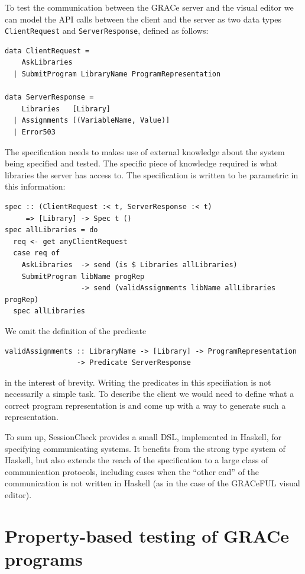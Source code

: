 \documentclass{article}
\begin{document}
To test the communication between the GRACe server and the visual editor we can model
the API calls between the client and the server as
two data types \texttt{ClientRequest} and
\texttt{ServerResponse}, defined as follows:
%
\begin{verbatim}
data ClientRequest =
    AskLibraries
  | SubmitProgram LibraryName ProgramRepresentation

data ServerResponse =
    Libraries   [Library]
  | Assignments [(VariableName, Value)]
  | Error503
\end{verbatim}

The specification needs to makes use of external knowledge about the system
being specified and tested.
%
The specific piece of knowledge required is what libraries the server has access
to.
%
The specification is written to be parametric in this information:

\begin{verbatim}
spec :: (ClientRequest :< t, ServerResponse :< t)
     => [Library] -> Spec t ()
spec allLibraries = do
  req <- get anyClientRequest
  case req of
    AskLibraries  -> send (is $ Libraries allLibraries)
    SubmitProgram libName progRep
                  -> send (validAssignments libName allLibraries progRep)
  spec allLibraries
\end{verbatim}

We omit the definition of the predicate
\begin{verbatim}
validAssignments :: LibraryName -> [Library] -> ProgramRepresentation
                 -> Predicate ServerResponse
\end{verbatim}
in the interest of brevity.
%
Writing the predicates in this specifiation is not necessarily a simple task.
%
To describe the client we would need to define what a correct program representation is
and come up with a way to generate such a representation.

To sum up, SessionCheck provides a small DSL, implemented in Haskell,
for specifying communicating systems.
%
It benefits from the strong type system of Haskell, but also extends
the reach of the specification to a large class of communication
protocols, including cases when the ``other end'' of the communication
is not written in Haskell (as in the case of the GRACeFUL visual
editor).

\section{Property-based testing of GRACe programs}
\label{sec:GCMP}
\end{document}
